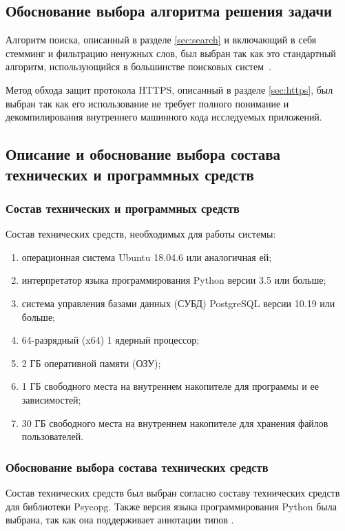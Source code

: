 \documentclass[a4paper,12pt]{article}
\begin{document}
  \subsection{Обоснование выбора алгоритма решения задачи}
  Алгоритм поиска, описанный в разделе \ref{sec:search} и включающий в себя стемминг и фильтрацию ненужных слов,
  был выбран так как это стандартный алгоритм, использующийся в большинстве поисковых систем~\cite{googlestemming}.

  Метод обхода защит протокола HTTPS, описанный в разделе \ref{sec:https},
  был выбран так как его использование не требует полного понимание и декомпилирования внутреннего машинного кода исследуемых приложений.

  \subsection{Описание и обоснование выбора состава технических и программных средств}
  \subsubsection{Состав технических и программных средств}
  Состав технических средств, необходимых для работы системы:
  \begin{enumerate}
    \item операционная система Ubuntu 18.04.6 или аналогичная ей;
    \item интерпретатор языка программирования Python версии 3.5 или больше;
    \item система управления базами данных (СУБД) PostgreSQL версии 10.19 или больше;
    \item 64-разрядный (x64) 1 ядерный процессор;
    \item 2 ГБ оперативной памяти (ОЗУ);
    \item 1 ГБ свободного места на внутреннем накопителе для программы и ее зависимостей;
    \item 30 ГБ свободного места на внутреннем накопителе для хранения файлов пользователей.
  \end{enumerate}

  \subsubsection{Обоснование выбора состава технических средств}
  Состав технических средств был выбран согласно составу технических средств для библиотеки Psycopg.
  Также версия языка программирования Python была выбрана, так как она поддерживает аннотации типов \cite{pythontype}.
\end{document}
